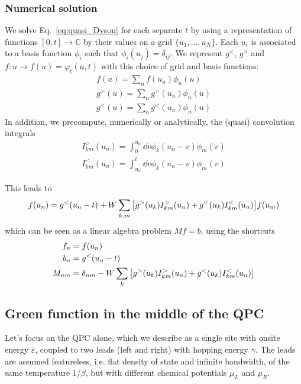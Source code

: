 \documentclass[12pt]{article}
\begin{document}
\subsubsection{Numerical solution}

We solve Eq.~\eqref{eq:quasi_Dyson} for each separate $t$ by using a representation of functions $[0, t] \rightarrow \mathbb{C}$ by their values on a grid $\{u_1, \ldots, u_N\}$. Each $u_i$ is associated to a basis function $\phi_i$ such that $\phi_i(u_j) = \delta_{ij}$. We represent $g^<$, $g^>$ and $f:u \rightarrow f(u) = \varphi_t(u, t)$ with this choice of grid and basis functions:
\begin{gather}
	f(u) = \sum_n f(u_n) \phi_n(u)
	\\
	g^>(u) = \sum_n g^>(u_n) \phi_n(u)
	\\
	g^<(u) = \sum_n g^<(u_n) \phi_n(u)
\end{gather}
In addition, we precompute, numerically or analytically, the (quasi) convolution integrals
\begin{gather}
	I^>_{km}(u_n) = \int_0^{u_n} \dd{v} \phi_k(u_n - v) \phi_m(v)
	\\
	I^<_{km}(u_n) = \int_{u_n}^t \dd{v} \phi_k(u_n - v) \phi_m(v)
\end{gather}

This leads to
\begin{equation}
	f(u_n) = g^<(u_n - t) + W \sum_{k,m} \qty[g^>(u_k) I^>_{km}(u_n) + g^<(u_k) I^<_{km}(u_n)] f(u_m)
\end{equation}
which can be seen as a linear algebra problem $M f = b$, using the shortcuts
\begin{align}
	f_n ={}& f(u_n)
	\\
	b_n ={}& g^<(u_n - t)
	\\
	M_{nm} ={}& \delta_{nm} - W \sum_k \qty[g^>(u_k) I^>_{km}(u_n) + g^<(u_k) I^<_{km}(u_n)]
\end{align}


\subsection{Green function in the middle of the QPC}

Let's focus on the QPC alone, which we describe as a single site with onsite energy $\varepsilon$, coupled to two leads (left and right) with hopping energy $\gamma$. The leads are assumed featureless, i.e. flat density of state and infinite bandwidth, of the same temperature $1/\beta$, but with different chemical potentials $\mu_L$ and $\mu_R$.
\end{document}
